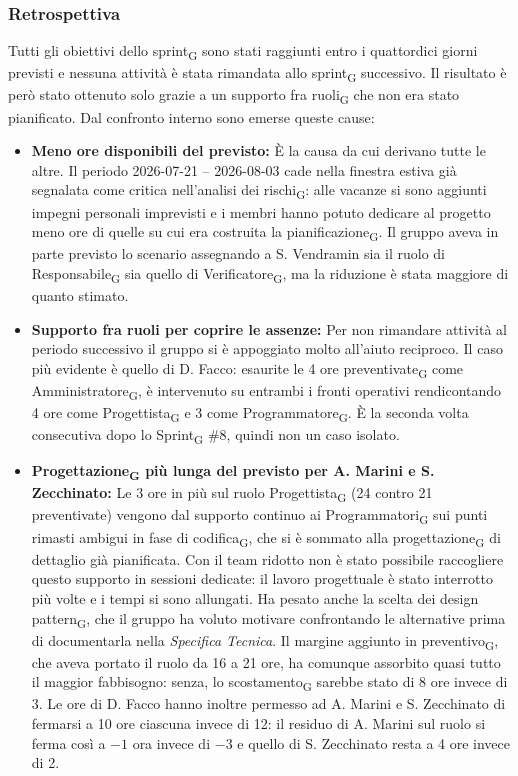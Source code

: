 ﻿\documentclass[a4paper, 10pt, colorlinks=true, linkcolor=black, urlcolor=blue, citecolor=blue, hidelinks]{article}
\begin{document}
\subsubsection{Retrospettiva}
Tutti gli obiettivi dello sprint\textsubscript{G} sono stati raggiunti entro i quattordici giorni previsti e nessuna attività è stata rimandata allo sprint\textsubscript{G} successivo. Il risultato è però stato ottenuto solo grazie a un supporto fra ruoli\textsubscript{G} che non era stato pianificato. Dal confronto interno sono emerse queste cause:
\begin{itemize}
    \item \textbf{Meno ore disponibili del previsto:} È la causa da cui derivano tutte le altre. Il periodo 2026-07-21 -- 2026-08-03 cade nella finestra estiva già segnalata come critica nell'analisi dei rischi\textsubscript{G}: alle vacanze si sono aggiunti impegni personali imprevisti e i membri hanno potuto dedicare al progetto meno ore di quelle su cui era costruita la pianificazione\textsubscript{G}. Il gruppo aveva in parte previsto lo scenario assegnando a S. Vendramin sia il ruolo di Responsabile\textsubscript{G} sia quello di Verificatore\textsubscript{G}, ma la riduzione è stata maggiore di quanto stimato.

    \item \textbf{Supporto fra ruoli per coprire le assenze:} Per non rimandare attività al periodo successivo il gruppo si è appoggiato molto all'aiuto reciproco. Il caso più evidente è quello di D. Facco: esaurite le 4 ore preventivate\textsubscript{G} come Amministratore\textsubscript{G}, è intervenuto su entrambi i fronti operativi rendicontando 4 ore come Progettista\textsubscript{G} e 3 come Programmatore\textsubscript{G}. È la seconda volta consecutiva dopo lo Sprint\textsubscript{G} \#8, quindi non un caso isolato.

    \item \textbf{Progettazione\textsubscript{G} più lunga del previsto per A. Marini e S. Zecchinato:} Le 3 ore in più sul ruolo Progettista\textsubscript{G} (24 contro 21 preventivate) vengono dal supporto continuo ai Programmatori\textsubscript{G} sui punti rimasti ambigui in fase di codifica\textsubscript{G}, che si è sommato alla progettazione\textsubscript{G} di dettaglio già pianificata. Con il team ridotto non è stato possibile raccogliere questo supporto in sessioni dedicate: il lavoro progettuale è stato interrotto più volte e i tempi si sono allungati. Ha pesato anche la scelta dei design pattern\textsubscript{G}, che il gruppo ha voluto motivare confrontando le alternative prima di documentarla nella \textit{Specifica Tecnica}. Il margine aggiunto in preventivo\textsubscript{G}, che aveva portato il ruolo da 16 a 21 ore, ha comunque assorbito quasi tutto il maggior fabbisogno: senza, lo scostamento\textsubscript{G} sarebbe stato di 8 ore invece di 3. Le ore di D. Facco hanno inoltre permesso ad A. Marini e S. Zecchinato di fermarsi a 10 ore ciascuna invece di 12: il residuo di A. Marini sul ruolo si ferma così a $-1$ ora invece di $-3$ e quello di S. Zecchinato resta a 4 ore invece di 2.


\end{itemize}
\end{document}
